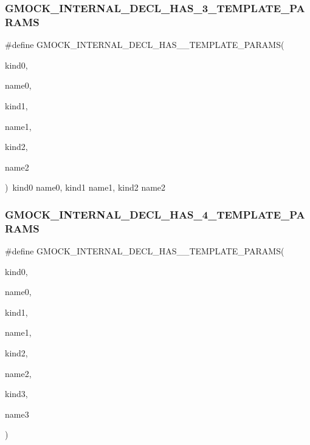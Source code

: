 \subsubsection{\texorpdfstring{GMOCK\_INTERNAL\_DECL\_HAS\_3\_TEMPLATE\_PARAMS}{GMOCK\_INTERNAL\_DECL\_HAS\_3\_TEMPLATE\_PARAMS}}
{\footnotesize\ttfamily \#define G\+M\+O\+C\+K\+\_\+\+I\+N\+T\+E\+R\+N\+A\+L\+\_\+\+D\+E\+C\+L\+\_\+\+H\+A\+S\+\_\+\_\+\+T\+E\+M\+P\+L\+A\+T\+E\+\_\+\+P\+A\+R\+A\+MS(\begin{DoxyParamCaption}\item[{}]{kind0,  }\item[{}]{name0,  }\item[{}]{kind1,  }\item[{}]{name1,  }\item[{}]{kind2,  }\item[{}]{name2 }\end{DoxyParamCaption})~kind0 name0, kind1 name1, kind2 name2}

\mbox{\label{gmock-generated-actions_8h_a19b48575600b1a046c3f77d5dfc124ba}} 
\subsubsection{\texorpdfstring{GMOCK\_INTERNAL\_DECL\_HAS\_4\_TEMPLATE\_PARAMS}{GMOCK\_INTERNAL\_DECL\_HAS\_4\_TEMPLATE\_PARAMS}}
{\footnotesize\ttfamily \#define G\+M\+O\+C\+K\+\_\+\+I\+N\+T\+E\+R\+N\+A\+L\+\_\+\+D\+E\+C\+L\+\_\+\+H\+A\+S\+\_\+\_\+\+T\+E\+M\+P\+L\+A\+T\+E\+\_\+\+P\+A\+R\+A\+MS(\begin{DoxyParamCaption}\item[{}]{kind0,  }\item[{}]{name0,  }\item[{}]{kind1,  }\item[{}]{name1,  }\item[{}]{kind2,  }\item[{}]{name2,  }\item[{}]{kind3,  }\item[{}]{name3 }\end{DoxyParamCaption})}

